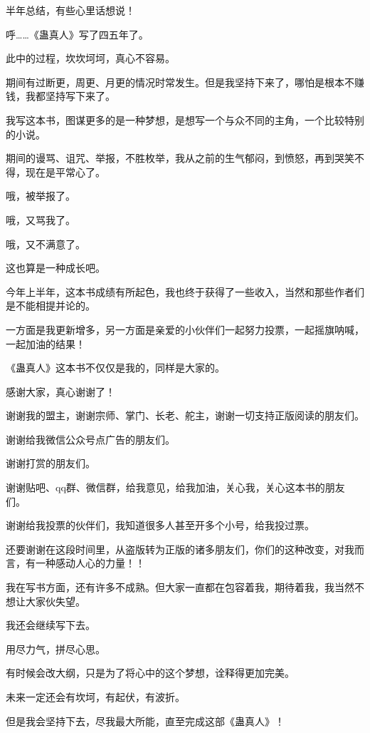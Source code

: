 \begin{this_body} %

半年总结，有些心里话想说！

呼……《蛊真人》写了四五年了。

此中的过程，坎坎坷坷，真心不容易。

期间有过断更，周更、月更的情况时常发生。但是我坚持下来了，哪怕是根本不赚钱，我都坚持写下来了。

我写这本书，图谋更多的是一种梦想，是想写一个与众不同的主角，一个比较特别的小说。

期间的谩骂、诅咒、举报，不胜枚举，我从之前的生气郁闷，到愤怒，再到哭笑不得，现在是平常心了。

哦，被举报了。

哦，又骂我了。

哦，又不满意了。

这也算是一种成长吧。

今年上半年，这本书成绩有所起色，我也终于获得了一些收入，当然和那些作者们是不能相提并论的。

一方面是我更新增多，另一方面是亲爱的小伙伴们一起努力投票，一起摇旗呐喊，一起加油的结果！

《蛊真人》这本书不仅仅是我的，同样是大家的。

感谢大家，真心谢谢了！

谢谢我的盟主，谢谢宗师、掌门、长老、舵主，谢谢一切支持正版阅读的朋友们。

谢谢给我微信公众号点广告的朋友们。

谢谢打赏的朋友们。

谢谢贴吧、qq群、微信群，给我意见，给我加油，关心我，关心这本书的朋友们。

谢谢给我投票的伙伴们，我知道很多人甚至开多个小号，给我投过票。

还要谢谢在这段时间里，从盗版转为正版的诸多朋友们，你们的这种改变，对我而言，有一种感动人心的力量！！

我在写书方面，还有许多不成熟。但大家一直都在包容着我，期待着我，我当然不想让大家伙失望。

我还会继续写下去。

用尽力气，拼尽心思。

有时候会改大纲，只是为了将心中的这个梦想，诠释得更加完美。

未来一定还会有坎坷，有起伏，有波折。

但是我会坚持下去，尽我最大所能，直至完成这部《蛊真人》！


\end{this_body}

